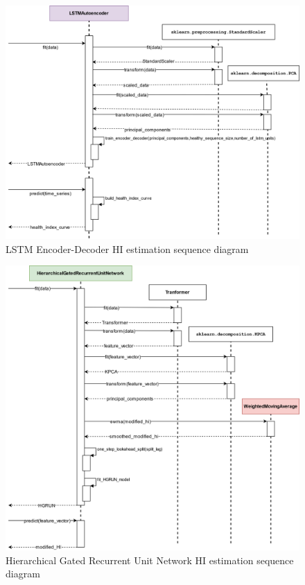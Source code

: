 \begin{figure}[H]
    \centering
    \includegraphics[width=\textwidth]{gfx/LSTMatuoencodersequencediagram.png}
    \caption{LSTM Encoder-Decoder HI estimation sequence diagram}
    \label{fig:sequence_lstm}
\end{figure}

\begin{figure}[H]
    \centering
    \includegraphics[width=\textwidth]{gfx/HGRUNsequencediagram.png}
    \caption{Hierarchical Gated Recurrent Unit Network HI estimation sequence diagram}
    \label{fig:sequence_hgrun}
\end{figure}

